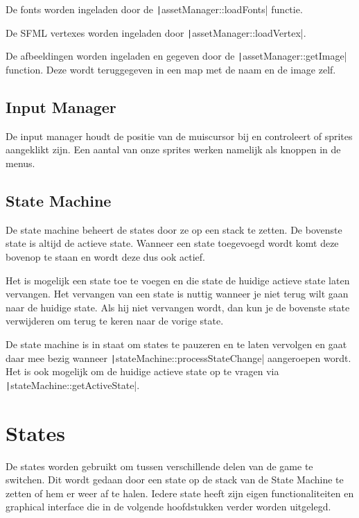 \documentclass{report}
\begin{document}
  De fonts worden ingeladen door de \texttt|assetManager::loadFonts| functie.

  De SFML vertexes worden ingeladen door \texttt|assetManager::loadVertex|.

  De afbeeldingen worden ingeladen en gegeven door de \texttt|assetManager::getImage| function. Deze wordt teruggegeven in een map met de naam en de image zelf.

  \section{Input Manager} %
  \label{sec:input_manager}
  De input manager houdt de positie van de muiscursor bij en controleert of sprites aangeklikt zijn. Een aantal van onze sprites werken namelijk als knoppen in de menus.

  \section{State Machine} %
  \label{sec:state_machine}
  De state machine beheert de states door ze op een stack te zetten. De bovenste state is altijd de actieve state. Wanneer een state toegevoegd wordt komt deze bovenop te staan en wordt deze dus ook actief.

  Het is mogelijk een state toe te voegen en die state de huidige actieve state laten vervangen. Het vervangen van een state is nuttig wanneer je niet terug wilt gaan naar de huidige state. Als hij niet vervangen wordt, dan kun je de bovenste state verwijderen om terug te keren naar de vorige state.

  De state machine is in staat om states te pauzeren en te laten vervolgen en gaat daar mee bezig wanneer \texttt|stateMachine::processStateChange| aangeroepen wordt.
  Het is ook mogelijk om de huidige actieve state op te vragen via \texttt|stateMachine::getActiveState|.

\chapter{States} %
\label{cha:states}
De states worden gebruikt om tussen verschillende delen van de game te switchen. Dit wordt gedaan door een state op de stack van de State Machine te zetten of hem er weer af te halen. Iedere state heeft zijn eigen functionaliteiten en graphical interface die in de volgende hoofdstukken verder worden uitgelegd.
\end{document}
